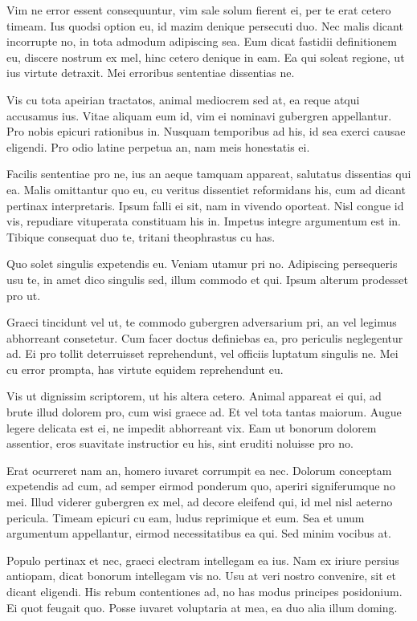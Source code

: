 Vim ne error essent consequuntur, vim sale solum fierent ei, per te erat cetero timeam. Ius quodsi option eu, id mazim denique persecuti duo. Nec malis dicant incorrupte no, in tota admodum adipiscing sea. Eum dicat fastidii definitionem eu, discere nostrum ex mel, hinc cetero denique in eam. Ea qui soleat regione, ut ius virtute detraxit. Mei erroribus sententiae dissentias ne.

 Vis cu tota apeirian tractatos, animal mediocrem sed at, ea reque atqui accusamus ius. Vitae aliquam eum id, vim ei nominavi gubergren appellantur. Pro nobis epicuri rationibus in. Nusquam temporibus ad his, id sea exerci causae eligendi. Pro odio latine perpetua an, nam meis honestatis ei.

 Facilis sententiae pro ne, ius an aeque tamquam appareat, salutatus dissentias qui ea. Malis omittantur quo eu, cu veritus dissentiet reformidans his, cum ad dicant pertinax interpretaris. Ipsum falli ei sit, nam in vivendo oporteat. Nisl congue id vis, repudiare vituperata constituam his in. Impetus integre argumentum est in. Tibique consequat duo te, tritani theophrastus cu has.

 Quo solet singulis expetendis eu. Veniam utamur pri no. Adipiscing persequeris usu te, in amet dico singulis sed, illum commodo et qui. Ipsum alterum prodesset pro ut.

 Graeci tincidunt vel ut, te commodo gubergren adversarium pri, an vel legimus abhorreant consetetur. Cum facer doctus definiebas ea, pro periculis neglegentur ad. Ei pro tollit deterruisset reprehendunt, vel officiis luptatum singulis ne. Mei cu error prompta, has virtute equidem reprehendunt eu.

 Vis ut dignissim scriptorem, ut his altera cetero. Animal appareat ei qui, ad brute illud dolorem pro, cum wisi graece ad. Et vel tota tantas maiorum. Augue legere delicata est ei, ne impedit abhorreant vix. Eam ut bonorum dolorem assentior, eros suavitate instructior eu his, sint eruditi noluisse pro no.

 Erat ocurreret nam an, homero iuvaret corrumpit ea nec. Dolorum conceptam expetendis ad cum, ad semper eirmod ponderum quo, aperiri signiferumque no mei. Illud viderer gubergren ex mel, ad decore eleifend qui, id mel nisl aeterno pericula. Timeam epicuri cu eam, ludus reprimique et eum. Sea et unum argumentum appellantur, eirmod necessitatibus ea qui. Sed minim vocibus at.

 Populo pertinax et nec, graeci electram intellegam ea ius. Nam ex iriure persius antiopam, dicat bonorum intellegam vis no. Usu at veri nostro convenire, sit et dicant eligendi. His rebum contentiones ad, no has modus principes posidonium. Ei quot feugait quo. Posse iuvaret voluptaria at mea, ea duo alia illum doming.

